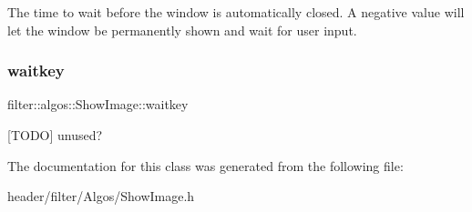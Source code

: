 The time to wait before the window is automatically closed. A negative value will let the window be permanently shown and wait for user input. \mbox{\label{classfilter_1_1algos_1_1_show_image_a111835d4501c5b624454a8e7525efeec}} 
\subsubsection{\texorpdfstring{waitkey}{waitkey}}
{\footnotesize\ttfamily filter\+::algos\+::\+Show\+Image\+::waitkey}

\mbox{[}T\+O\+DO\mbox{]} unused? 

The documentation for this class was generated from the following file\+:\begin{DoxyCompactItemize}
\item 
header/filter/\+Algos/Show\+Image.\+h\end{DoxyCompactItemize}
